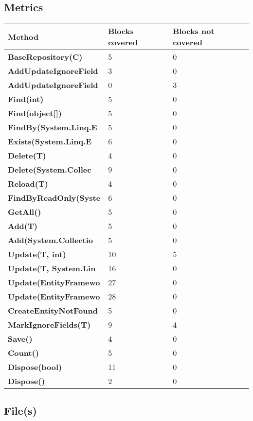 \documentclass[a4paper,10pt]{article}
\begin{document}
\subsection{Metrics}
\begin{longtable}[l]{|l|l|l|}
\hline
\textbf{Method} & \textbf{Blocks covered} & \textbf{Blocks not covered}\\
\hline
\textbf{BaseRepository(C)} & 5 & 0\\
\hline
\textbf{AddUpdateIgnoreField} & 3 & 0\\
\hline
\textbf{AddUpdateIgnoreField} & 0 & 3\\
\hline
\textbf{Find(int)} & 5 & 0\\
\hline
\textbf{Find(object[])} & 5 & 0\\
\hline
\textbf{FindBy(System.Linq.E} & 5 & 0\\
\hline
\textbf{Exists(System.Linq.E} & 6 & 0\\
\hline
\textbf{Delete(T)} & 4 & 0\\
\hline
\textbf{Delete(System.Collec} & 9 & 0\\
\hline
\textbf{Reload(T)} & 4 & 0\\
\hline
\textbf{FindByReadOnly(Syste} & 6 & 0\\
\hline
\textbf{GetAll()} & 5 & 0\\
\hline
\textbf{Add(T)} & 5 & 0\\
\hline
\textbf{Add(System.Collectio} & 5 & 0\\
\hline
\textbf{Update(T, int)} & 10 & 5\\
\hline
\textbf{Update(T, System.Lin} & 16 & 0\\
\hline
\textbf{Update(EntityFramewo} & 27 & 0\\
\hline
\textbf{Update(EntityFramewo} & 28 & 0\\
\hline
\textbf{CreateEntityNotFound} & 5 & 0\\
\hline
\textbf{MarkIgnoreFields(T)} & 9 & 4\\
\hline
\textbf{Save()} & 4 & 0\\
\hline
\textbf{Count()} & 5 & 0\\
\hline
\textbf{Dispose(bool)} & 11 & 0\\
\hline
\textbf{Dispose()} & 2 & 0\\
\hline
\end{longtable}
\subsection{File(s)}
\end{document}
